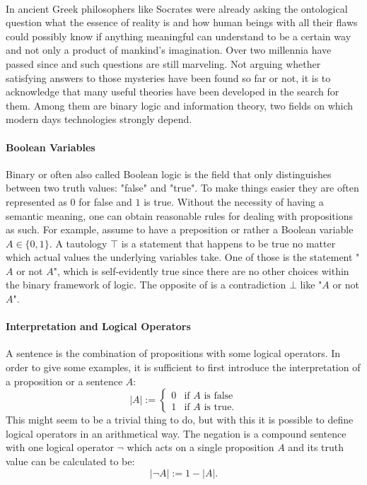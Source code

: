 \paragraph*{}
In ancient Greek philosophers like Socrates were already asking the ontological question what the essence of reality is and how human beings with all their flaws could possibly know if anything meaningful can understand to be a certain way and not only a product of mankind's imagination. Over two millennia have passed since and such questions are still marveling. Not arguing whether satisfying answers to those mysteries have been found so far or not, it is to acknowledge that many useful theories have been developed in the search for them. Among them are binary logic and information theory, two fields on which modern days technologies strongly depend.

\paragraph*{Boolean Variables}
Binary or often also called Boolean logic is the field that only distinguishes between two truth values: "false" and "true". To make things easier they are often represented as $ 0 $ for false and $ 1 $ is true. Without the necessity of having a semantic meaning, one can obtain reasonable rules for dealing with propositions as such. For example, assume to have a preposition or rather a Boolean variable $ A \in \{0,1\}$. A tautology $ \top $ is a statement that happens to be true no matter which actual values the underlying variables take. One of those is the statement "$ A $ or not $ A $", which is self-evidently true since there are no other choices within the binary framework of logic. The opposite of is a contradiction $ \bot $ like "$ A $ or not $ A $".

\paragraph*{Interpretation and Logical Operators}
A sentence is the combination of propositions with some logical operators. In order to give some examples, it is sufficient to first introduce the interpretation of a proposition or a sentence $ A $:
\begin{equation}
|A| := \begin{cases}
0 & \text{if $A$ is false}\\
1 & \text{if $A$ is true.}
\end{cases}
\end{equation}
This might seem to be a trivial thing to do, but with this it is possible to define logical operators in an arithmetical way. The negation is a compound sentence with one logical operator $ \neg $ which acts on a single proposition $ A $ and its truth value can be calculated to be:
\begin{equation}
|\neg A| := 1 - |A|.
\end{equation}
